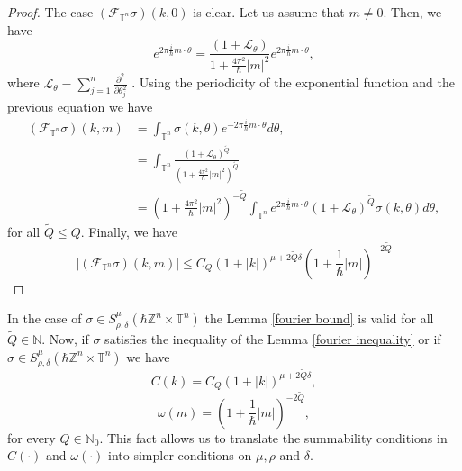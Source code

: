 \documentclass[pdflatex,sn-mathphys-num]{sn-jnl}%
\theoremstyle{thmstyleone}%
\theoremstyle{thmstyletwo}%
\theoremstyle{thmstylethree}%
\begin{document}
\begin{proof}
    The case $(\mathcal{F}_{\mathbb{T}^n}\sigma)(k,0)$ is clear. Let us assume that $m\neq 0$. Then, we have
    \[e^{2\pi \frac{i}{\hbar} m\cdot \theta}= \frac{(1+\mathcal{L}_\theta)}{1+\frac{4\pi^2}{\hbar}|m|^2}e^{2\pi \frac{i}{\hbar} m\cdot \theta},  \]
    where $\mathcal{L}_\theta=\sum^{n}_{j=1}\frac{\partial^2}{\partial \theta_j^2}$ \cite{botchway2020difference}. Using the periodicity of the exponential function and the previous equation we have
    \begin{align*}
        (\mathcal{F}_{\mathbb{T}^n}\sigma)(k,m)&=\int_{\mathbb{T}^n} \sigma(k,\theta)e^{-2\pi\frac{i}{\hbar}m\cdot \theta}d\theta,\\
        &= \int_{\mathbb{T}^n}  \frac{(1+\mathcal{L}_\theta)^{\tilde{Q}} }{(1+\frac{4\pi^2}{\hbar}|m|^2)^{\tilde{Q}}}   \\
        &= \left(1+\frac{4\pi^2}{\hbar}|m|^2\right)^{-\tilde{Q}} \int_{\mathbb{T}^n} e^{2\pi \frac{i}{\hbar} m\cdot \theta} (1+\mathcal{L}_\theta)^{\tilde{Q}}\sigma(k,\theta)d\theta, 
    \end{align*}
    for all $\tilde{Q}\leq Q$. Finally, we have
    \[ |(\mathcal{F}_{\mathbb{T}^n}\sigma)(k,m)|\leq C_Q (1+|k|)^{\mu+2\tilde{Q}\delta} \left(1+\frac{1}{\hbar}|m|\right)^{-2\tilde{Q}}  \]
\end{proof}
In the case of $\sigma\in S^\mu_{\rho,\delta}(\hbar\mathbb{Z}^n\times\mathbb{T}^n)$ the Lemma \ref{fourier bound} is valid for all $\tilde{Q}\in\mathbb{N}$. Now, if $\sigma$ satisfies the inequality of the Lemma \ref{fourier inequality} or if $\sigma\in S^\mu_{\rho,\delta}(\hbar\mathbb{Z}^n\times\mathbb{T}^n)$ we have 
\begin{equation}\label{C()}
    C(k)= C_Q\left( 1+|k| \right)^{\mu+2\tilde{Q}\delta},
\end{equation} 
\begin{equation}\label{w()}
    \omega(m)= \left( 1+\frac{1}{\hbar}|m| \right)^{-2\tilde{Q}},
\end{equation} for every $Q\in\mathbb{N}_0$. This fact allows us to translate the summability conditions in $C(\cdot)$ and $\omega(\cdot)$ into simpler conditions on $\mu,\rho$ and $\delta$.
\end{document}
